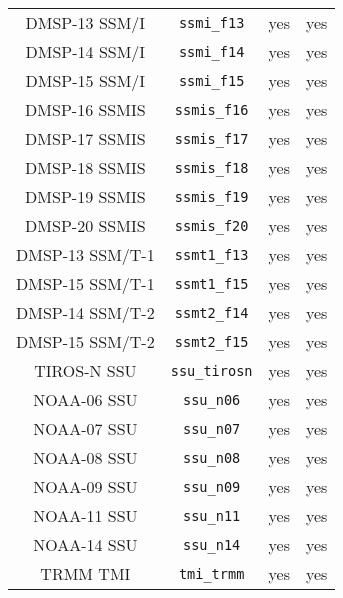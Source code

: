 \begin{center}
\begin{longtable}{c c c c}
  DMSP-13 SSM/I                      & \texttt{ssmi\_f13}           &  yes     &  yes       \\
  DMSP-14 SSM/I                      & \texttt{ssmi\_f14}           &  yes     &  yes       \\
  DMSP-15 SSM/I                      & \texttt{ssmi\_f15}           &  yes     &  yes       \\
  DMSP-16 SSMIS                      & \texttt{ssmis\_f16}          &  yes     &  yes       \\
  DMSP-17 SSMIS                      & \texttt{ssmis\_f17}          &  yes     &  yes       \\
  DMSP-18 SSMIS                      & \texttt{ssmis\_f18}          &  yes     &  yes       \\
  DMSP-19 SSMIS                      & \texttt{ssmis\_f19}          &  yes     &  yes       \\
  DMSP-20 SSMIS                      & \texttt{ssmis\_f20}          &  yes     &  yes       \\
  DMSP-13 SSM/T-1                    & \texttt{ssmt1\_f13}          &  yes     &  yes       \\
  DMSP-15 SSM/T-1                    & \texttt{ssmt1\_f15}          &  yes     &  yes       \\
  DMSP-14 SSM/T-2                    & \texttt{ssmt2\_f14}          &  yes     &  yes       \\
  DMSP-15 SSM/T-2                    & \texttt{ssmt2\_f15}          &  yes     &  yes       \\
  TIROS-N SSU                        & \texttt{ssu\_tirosn}         &  yes     &  yes       \\ 
  NOAA-06 SSU                        & \texttt{ssu\_n06}            &  yes     &  yes       \\
  NOAA-07 SSU                        & \texttt{ssu\_n07}            &  yes     &  yes       \\
  NOAA-08 SSU                        & \texttt{ssu\_n08}            &  yes     &  yes       \\
  NOAA-09 SSU                        & \texttt{ssu\_n09}            &  yes     &  yes       \\
  NOAA-11 SSU                        & \texttt{ssu\_n11}            &  yes     &  yes       \\
  NOAA-14 SSU                        & \texttt{ssu\_n14}            &  yes     &  yes       \\
  TRMM TMI                           & \texttt{tmi\_trmm}           &  yes     &  yes       \\

\end{longtable}
\end{center}
